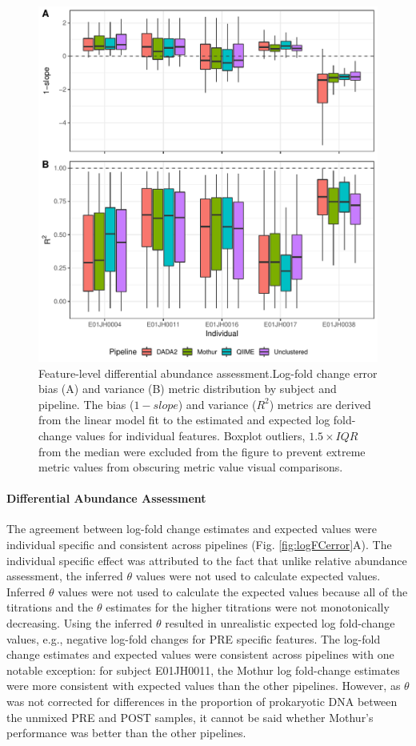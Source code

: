 \documentclass[linenumbers]{bmcart}
\begin{document}
\begin{figure}
\centering
\includegraphics{logFcErrorMetrics-1.pdf}
\caption{\label{fig:logFcErrorMetrics}Feature-level differential abundance assessment.Log-fold change error
bias (A) and variance (B) metric distribution by subject and pipeline.
The bias (\(1 - slope\)) and variance (\(R^2\)) metrics are derived from
the linear model fit to the estimated and expected log fold-change
values for individual features. Boxplot outliers, \(1.5\times IQR\) from
the median were excluded from the figure to prevent extreme metric
values from obscuring metric value visual comparisons.}
\end{figure}

\paragraph{Differential Abundance Assessment}
The agreement between log-fold change estimates and expected values were
individual specific and consistent across pipelines (Fig.
\ref{fig:logFCerror}A). The individual specific effect was attributed to
the fact that unlike relative abundance assessment, the inferred
\(\theta\) values were not used to calculate expected values. Inferred
\(\theta\) values were not used to calculate the expected values because
all of the titrations and the \(\theta\) estimates for the higher
titrations were not monotonically decreasing.
Using the inferred \(\theta\) resulted in unrealistic expected log fold-change values, e.g.,
negative log-fold changes for PRE specific features. The log-fold change
estimates and expected values were consistent across pipelines with one
notable exception: for subject E01JH0011, the Mothur log fold-change estimates
were more consistent with expected values than the other pipelines.
However, as \(\theta\) was not corrected for differences in the
proportion of prokaryotic DNA between the unmixed PRE and POST samples,
it cannot be said whether Mothur's performance was better than the other
pipelines.
\end{document}
